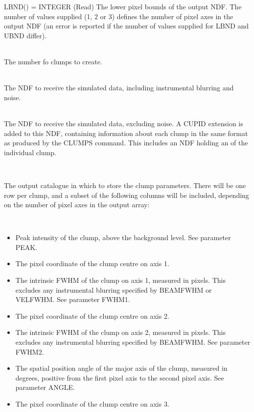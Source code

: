 \documentclass[twoside,11pt]{article}
\renewcommand{\_}{\texttt{\symbol{95}}}
\newcommand{\sstsubsection}[1]{ \item[{#1}] \mbox{} \\}
\newcommand{\sstitemlist}[1]{
  \mbox{} \\
  \vspace{-3.5ex}
  \begin{itemize}
     #1
  \end{itemize}
}
\newcommand{\sstitem}{\item}
\newcommand{\sstsubsection}[1]{\item[{#1}]}
\newcommand{\sstitemlist}[1]{
      \begin{itemize}
         #1
      \end{itemize}
      \\
   }
\newcommand{\sstitem}{\item}
\begin{document}
{{{         LBND() = \_INTEGER (Read)
      }{
         The lower pixel bounds of the output NDF. The number of values
         supplied (1, 2 or 3) defines the number of pixel axes in the output
         NDF (an error is reported if the number of values supplied for LBND
         and UBND differ).
      }
      \sstsubsection{
         NCLUMP = \_INTEGER (Read)
      }{
         The number fo clumps to create.
      }
      \sstsubsection{
         OUT = NDF (Write)
      }{
         The NDF to receive the simulated data, including instrumental
         blurring and noise.
      }
      \sstsubsection{
         MODEL = NDF (Write)
      }{
         The NDF to receive the simulated data, excluding noise. A CUPID
         extension is added to this NDF, containing information about each
         clump in the same format as produced by the CLUMPS command. This
         includes an NDF holding an of the individual clump.
      }
      \sstsubsection{
         OUTCAT = FILENAME (Write)
      }{
         The output catalogue in which to store the clump parameters.
         There will be one row per clump, and a subset of the following
         columns will be included, depending on the number of pixel axes
         in the output array:

         \sstitemlist{

            \sstitem
               Peak intensity of the clump, above the background level.
               See parameter PEAK.

            \sstitem
               The pixel coordinate of the clump centre on axis 1.

            \sstitem
               The intrinsic FWHM of the clump on axis 1, measured in
               pixels. This excludes any instrumental blurring specified by
               BEAMFWHM or VELFWHM. See parameter FWHM1.

            \sstitem
               The pixel coordinate of the clump centre on axis 2.

            \sstitem
               The intrinsic FWHM of the clump on axis 2, measured in
               pixels. This excludes any instrumental blurring specified by
               BEAMFWHM. See parameter FWHM2.

            \sstitem
               The spatial position angle of the major axis of the clump,
               measured in degrees, positive from the first pixel axis to the
               second pixel axis. See parameter ANGLE.

            \sstitem
               The pixel coordinate of the clump centre on axis 3.

}}}}
\end{document}
